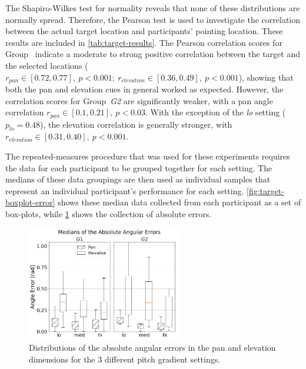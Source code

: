 \documentclass[acmsmall]{acmart}
\begin{document}
The Shapiro-Wilkes test for normality reveals that none of these distributions are normally spread. Therefore, the Pearson test is used to investigate the correlation between the actual target location and participants' pointing location.
These results are included in \cref{tab:target-results}.
The Pearson correlation scores for Group~ indicate a moderate to strong positive correlation between the target and the selected locations ($r_{pan} \in [0.72, 0.77],~p < 0.001;~r_{elevation} \in [0.36, 0.49],~p < 0.001$), showing that both the pan and elevation cues in general worked as expected.
However, the correlation scores for Group~\textit{G2} are significantly weaker, with a pan angle correlation $r_{pan} \in [0.1, 0.21],~p < 0.03$.
With the exception of the \textit{lo} setting ($p_{lo} = 0.48$), the elevation correlation is generally stronger, with $r_{elevation} \in [0.31, 0.40],~p < 0.001$.

The repeated-measures procedure that was used for these experiments requires the data for each participant to be grouped together for each setting.
The medians of these data groupings are then used as individual samples that represent an individual participant's performance for each setting.
\cref{fig:target-boxplot-error} shows these median data collected from each participant as a set of box-plots, while \cref{fig:target-boxplot-absolute-errors} shows the collection of absolute errors.

\begin{figure}
  \centering
  \includegraphics[width=0.6\textwidth]{figures/boxplot_target_search_absolute_median_error.png}
  \caption{Distributions of the absolute angular errors in the pan and elevation dimensions for the 3 different pitch gradient settings. }\label{fig:target-boxplot-absolute-errors}
\end{figure}
\end{document}
